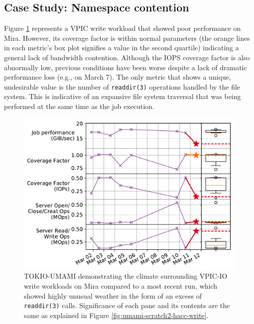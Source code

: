 \subsection{Case Study: Namespace contention}

Figure \ref{fig:umami-mira-fs1-vpic-write} represents a VPIC write workload
that showed poor performance on Mira.
However, its coverage factor is within normal parameters (the orange lines in each metric's box plot signifies a value in the second quartile) indicating a general lack of bandwidth contention.
Although the IOPS coverage factor is also abnormally low, previous conditions have been worse despite a lack of dramatic performance loss (e.g., on March 7).
The only metric that shows a unique, undesirable value is the number of \texttt{readdir(3)} operations handled by the file system.
This is indicative of an expansive file system traversal that was being performed at the same time as the job execution.

\begin{figure}[t]
    \centering
    \includegraphics[width=1.0\columnwidth]{figs/umami-mira-fs1-vpic-write.pdf}
    \caption{TOKIO-UMAMI demonstrating the climate surrounding VPIC-IO write workloads on Mira compared to a most recent run, which showed highly unusual weather in the form of an excess of \texttt{readdir(3)} calls.
    Significance of each pane and its contents are the same as explained in Figure \ref{fig:umami-scratch2-hacc-write}.}
    \label{fig:umami-mira-fs1-vpic-write}
\vspace{-.2in}
\end{figure}

